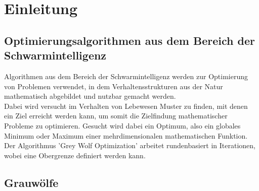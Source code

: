 \chapter{Einleitung}

\section{Optimierungsalgorithmen aus dem Bereich der Schwarmintelligenz}
Algorithmen aus dem Bereich der Schwarmintelligenz werden zur Optimierung von Problemen verwendet, in dem Verhaltensstrukturen aus der Natur mathematisch abgebildet und nutzbar gemacht werden.\\
Dabei wird versucht im Verhalten von Lebewesen Muster zu finden, mit denen ein Ziel erreicht werden kann, um somit die Zielfindung mathematischer Probleme zu optimieren. Gesucht wird dabei ein Optimum, also ein globales Minimum oder Maximum einer mehrdimensionalen mathematischen Funktion.\\
Der Algorithmus 'Grey Wolf Optimization' arbeitet rundenbasiert in Iterationen, wobei eine Obergrenze definiert werden kann.

\section{Grauwölfe}
